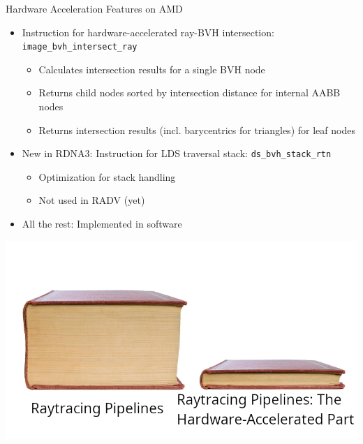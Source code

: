 \documentclass[aspectratio=169,t]{beamer}
\begin{document}
\begin{slide}{Hardware Acceleration Features on AMD}
 \begin{itemize}
  \item Instruction for hardware-accelerated ray-BVH intersection: \texttt{image\_bvh\_intersect\_ray}
  \begin{itemize}
   \item Calculates intersection results for a single BVH node
   \item Returns child nodes sorted by intersection distance for internal AABB nodes
   \item Returns intersection results (incl. barycentrics for triangles) for leaf nodes
  \end{itemize}
 \end{itemize}
 \begin{itemize}
  \item New in RDNA3: Instruction for LDS traversal stack: \texttt{ds\_bvh\_stack\_rtn}
  \begin{itemize}
   \item Optimization for stack handling
   \item Not used in RADV (yet)
  \end{itemize}
 \item All the rest: Implemented in software
 \end{itemize}

 \vspace*{-40pt}
 \hspace*{240pt}
 \includegraphics{graphics/booksmeme.png}
\end{slide}
\end{document}
